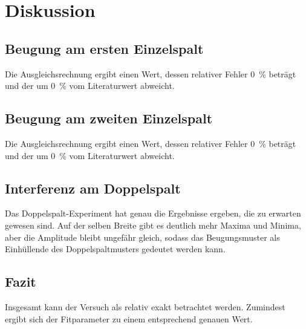 \section{Diskussion}
\label{sec:Diskussion}

\subsection{Beugung am ersten Einzelspalt}
Die Ausgleichsrechnung ergibt einen Wert, dessen relativer Fehler \SI{0}{\percent} beträgt und der um \SI{0}{\percent} vom Literaturwert abweicht. 


\subsection{Beugung am zweiten Einzelspalt}
Die Ausgleichsrechnung ergibt einen Wert, dessen relativer Fehler \SI{0}{\percent} beträgt und der um \SI{0}{\percent} vom Literaturwert abweicht. 

\subsection{Interferenz am Doppelspalt}
Das Doppelspalt-Experiment hat genau die Ergebnisse ergeben, die zu erwarten gewesen sind. Auf der selben Breite gibt es deutlich mehr Maxima und Minima, aber die Amplitude bleibt ungefähr gleich, sodass das Beugungsmuster als Einhüllende des Doppelspaltmusters gedeutet werden kann. 

\subsection{Fazit} 
Insgesamt kann der Versuch als relativ exakt betrachtet werden. Zumindest ergibt sich der Fitparameter zu einem entsprechend genauen Wert. 

\newpage